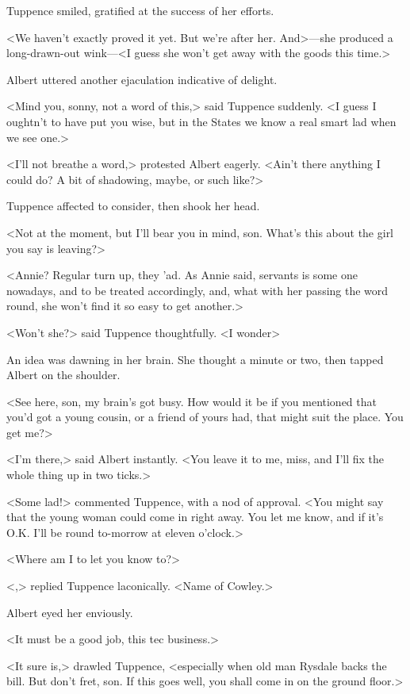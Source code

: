 Tuppence smiled, gratified at the success of her efforts.

<We haven't exactly proved it yet. But we're after her. And>—she produced a long-drawn-out wink—<I guess she won't get away with the goods this time.>

Albert uttered another ejaculation indicative of delight.

<Mind you, sonny, not a word of this,> said Tuppence suddenly. <I guess I oughtn't to have put you wise, but in the States we know a real smart lad when we see one.>

<I'll not breathe a word,> protested Albert eagerly. <Ain't there anything I could do? A bit of shadowing, maybe, or such like?>

Tuppence affected to consider, then shook her head.

<Not at the moment, but I'll bear you in mind, son. What's this about the girl you say is leaving?>

<Annie? Regular turn up, they 'ad. As Annie said, servants is some one nowadays, and to be treated accordingly, and, what with her passing the word round, she won't find it so easy to get another.>

<Won't she?> said Tuppence thoughtfully. <I wonder\longdash>

An idea was dawning in her brain. She thought a minute or two, then tapped Albert on the shoulder.

<See here, son, my brain's got busy. How would it be if you mentioned that you'd got a young cousin, or a friend of yours had, that might suit the place. You get me?>

<I'm there,> said Albert instantly. <You leave it to me, miss, and I'll fix the whole thing up in two ticks.>

<Some lad!> commented Tuppence, with a nod of approval. <You might say that the young woman could come in right away. You let me know, and if it's O.K. I'll be round to-morrow at eleven o'clock.>

<Where am I to let you know to?>

<,> replied Tuppence laconically. <Name of Cowley.>

Albert eyed her enviously.

<It must be a good job, this tec business.>

<It sure is,> drawled Tuppence, <especially when old man Rysdale backs the bill. But don't fret, son. If this goes well, you shall come in on the ground floor.>

